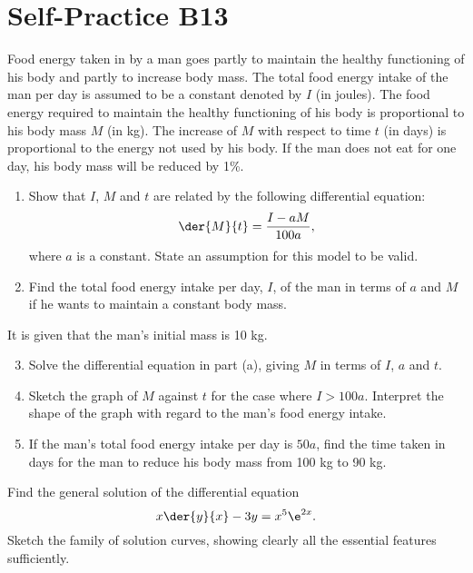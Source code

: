 \section{Self-Practice B13}

\begin{problem}
    Food energy taken in by a man goes partly to maintain the healthy functioning of his body and partly to increase body mass. The total food energy intake of the man per day is assumed to be a constant denoted by $I$ (in joules). The food energy required to maintain the healthy functioning of his body is proportional to his body mass $M$ (in kg). The increase of $M$ with respect to time $t$ (in days) is proportional to the energy not used by his body. If the man does not eat for one day, his body mass will be reduced by 1\%. 
    
    \begin{enumerate}
        \item Show that $I$, $M$ and $t$ are related by the following differential equation: \[\der{M}{t} = \frac{I - aM}{100a},\] where $a$ is a constant. State an assumption for this model to be valid.
        \item Find the total food energy intake per day, $I$, of the man in terms of $a$ and $M$ if he wants to maintain a constant body mass.
    \end{enumerate}

    It is given that the man's initial mass is 10 kg.
    
    \begin{enumerate}
        \setcounter{enumi}{2}
        \item Solve the differential equation in part (a), giving $M$ in terms of $I$, $a$ and $t$.
        \item Sketch the graph of $M$ against $t$ for the case where $I > 100a$. Interpret the shape of the graph with regard to the man's food energy intake.
        \item If the man's total food energy intake per day is $50a$, find the time taken in days for the man to reduce his body mass from 100 kg to 90 kg.
    \end{enumerate}
\end{problem}

\begin{problem}
    Find the general solution of the differential equation \[x \der{y}{x} - 3y = x^5 \e^{2x}.\] Sketch the family of solution curves, showing clearly all the essential features sufficiently.
\end{problem}

